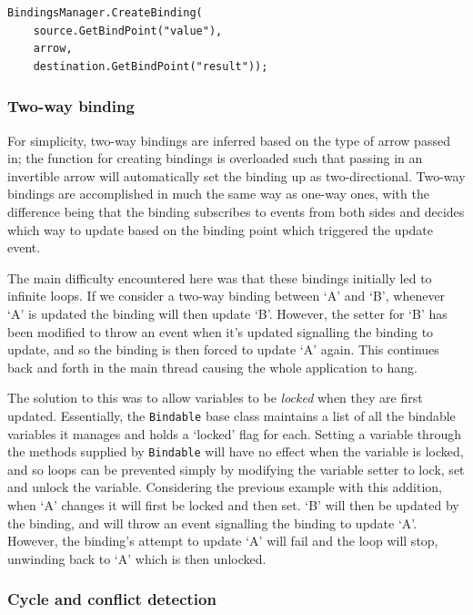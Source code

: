 \documentclass[12pt,twoside,notitlepage]{report}
\begin{document}
\begin{lstlisting}[language={[Sharp]C}, caption={Creating a binding between two properties}, label=lst:creating_simple_binding]
BindingsManager.CreateBinding(
	source.GetBindPoint("value"),
	arrow,
	destination.GetBindPoint("result"));
\end{lstlisting}

\subsubsection{Two-way binding}

For simplicity, two-way bindings are inferred based on the type of arrow passed in; the function for creating bindings is overloaded such that passing in an invertible arrow will automatically set the binding up as two-directional. Two-way bindings are accomplished in much the same way as one-way ones, with the difference being that the binding subscribes to events from both sides and decides which way to update based on the binding point which triggered the update event.

The main difficulty encountered here was that these bindings initially led to infinite loops. If we consider a two-way binding between `A' and `B', whenever `A' is updated the binding will then update `B'. However, the setter for `B' has been modified to throw an event when it's updated signalling the binding to update, and so the binding is then forced to update `A' again. This continues back and forth in the main thread causing the whole application to hang.

The solution to this was to allow variables to be \textit{locked} when they are first updated. Essentially, the \texttt{Bindable} base class maintains a list of all the bindable variables it manages and holds a `locked' flag for each. Setting a variable through the methods supplied by \texttt{Bindable} will have no effect when the variable is locked, and so loops can be prevented simply by modifying the variable setter to lock, set and unlock the variable. Considering the previous example with this addition, when `A' changes it will first be locked and then set. `B' will then be updated by the binding, and will throw an event signalling the binding to update `A'. However, the binding's attempt to update `A' will fail and the loop will stop, unwinding back to `A' which is then unlocked.

\subsubsection{Cycle and conflict detection}
\end{document}
